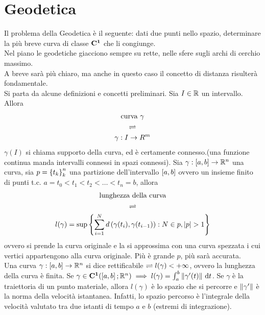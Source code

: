 \section{Geodetica}
Il problema della Geodetica è il seguente: dati due punti nello spazio, determinare la più breve curva di classe $ \mathbf{C^{1}} $ che li congiunge.\\
Nel piano le geodetiche giacciono sempre su rette, nelle sfere sugli archi di cerchio massimo.\\
A breve sarà più chiaro, ma anche in questo caso il concetto di distanza risulterà fondamentale.\\
Si parta da alcune definizioni e concetti preliminari.
Sia $ I \in \mathbb{R} $ un intervallo. Allora
\[
	\begin{gathered}
		\text{curva } \gamma\\
		\rightleftharpoons\\
		\gamma: I \to R^m
	\end{gathered}
\]
\observation
$\gamma(I)$ si chiama supporto della curva, ed è certamente connesso.(una funzione continua manda intervalli connessi in spazi connessi).
Sia $\gamma : \left[a,b\right] \to \mathbb{R}^n$ una curva, sia $ p = \left\{ t_k \right\}_k^n $ una partizione dell'intervallo $ \left[a,b\right] $
ovvero un insieme finito di punti t.c. $ a = t_0 < t_1 < t_2 < \ldots < t_n = b $, allora
\[
	\begin{gathered}
		\text{lunghezza della curva}\\
		\bydef\\
		l(\gamma)=\sup\brackets{\sum\limits_{i=1}^{N}d\left(\gamma(t_i), \gamma(t_{i-1})\right): N \in p,|p|>1}
	\end{gathered}
\]
ovvero si prende la curva originale e la si approssima con una curva spezzata i cui vertici appartengono alla curva originale.
Più è grande $ p $, più sarà accurata.\\
Una curva $\gamma : \left[a,b\right] \to \mathbb{R}^n$ si dice rettificabile $\rightleftharpoons l(\gamma)<+\infty$, ovvero la lunghezza della curva è finita.
\proposition
\label{prop:lunghezza_curva_integrale}
Se $\gamma\in \mathbf{C^{1}}(\left[a,b\right]; \mathbb{R} ^n)\implies l(\gamma)=\int_a^b\left\|\gamma'(t)\right\|\,\mathrm{d}{t}$.
\observation
Se $\gamma$ è la traiettoria di un punto materiale, allora $l(\gamma)$ è lo spazio che si percorre e $\left\|\gamma'\right\|$ è la norma della velocità istantanea. Infatti, lo spazio percorso è l'integrale della velocità valutato tra due istanti di tempo $a$ e $b$ (estremi di integrazione).

